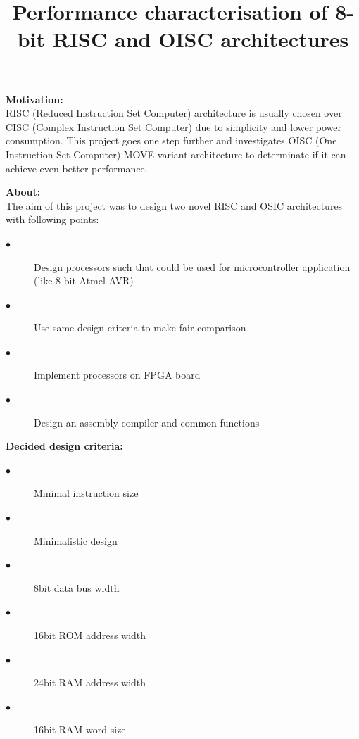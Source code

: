 \documentclass[portrait,color=UCLmidgreen,margin=1.5cm,bannerheight=8cm,logoheight=3.5cm]{uclposter}
\title{Performance characterisation of 8-bit RISC and OISC architectures}
\begin{document}

\maketitle
{}
\newcommand{\strutm}{\rule[-.15\baselineskip]{0pt}{\baselineskip}}

\begin{tcolorbox}[title=Introduction]
	\begin{Row}\begin{Cell}{2}
	\textbf{Motivation:}\\
	RISC (Reduced Instruction Set Computer) architecture is usually chosen over CISC (Complex Instruction Set Computer) due to simplicity and lower power consumption. This project goes one step further and investigates OISC (One Instruction Set Computer) MOVE variant architecture to determinate if it can achieve even better performance.
	\end{Cell}\begin{Cell}{2}
	\textbf{About:}\\
	The aim of this project was to design two novel RISC and OSIC architectures with following points:
	\begin{description}
		\item[$\bullet$] Design processors such that could be used for microcontroller application (like 8-bit Atmel AVR)
		\item[$\bullet$] Use same design criteria to make fair comparison
		\item[$\bullet$] Implement processors on FPGA board
		\item[$\bullet$] Design an assembly compiler and common functions
	\end{description} 
	\end{Cell}\begin{Cell}{1}
	\textbf{Decided design criteria:}
	\begin{description}
		\item[$\bullet$] Minimal instruction size
		\item[$\bullet$] Minimalistic design
		\item[$\bullet$] 8bit data bus width
		\item[$\bullet$] 16bit ROM address width
		\item[$\bullet$] 24bit RAM address width
		\item[$\bullet$] 16bit RAM word size
	\end{description}
	\end{Cell}\end{Row}
\end{tcolorbox}
\end{document}
